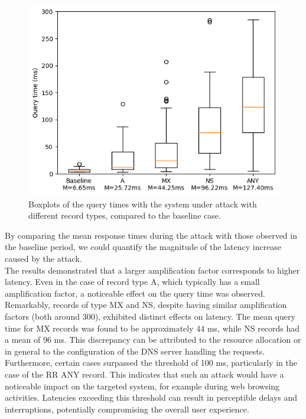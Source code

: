 \begin{figure}[H]
    \centering
    \includegraphics[width=\columnwidth]{Sections/Images/Boxplots_Query.png}
    \caption{Boxplots of the query times with the system under attack with different record types, compared to the baseline case.}
    \label{fig:Boxplots_Query1}
\end{figure}
\noindent By comparing the mean response times during the attack with those observed in the baseline period, we could quantify the magnitude of the latency increase caused by the attack.\\
The results demonstrated that a larger amplification factor corresponds to higher latency. Even in the case of record type A, which typically has a small amplification factor, a noticeable effect on the query time was observed. Remarkably, records of type MX and NS, despite having similar amplification factors (both around 300), exhibited distinct effects on latency. The mean query time for MX records was found to be approximately 44 ms, while NS records had a mean of 96 ms. This discrepancy can be attributed to the resource allocation or in general to the configuration of the DNS server handling the requests.\\
Furthermore, certain cases surpassed the threshold of 100 ms, particularly in the case of the RR ANY record. This indicates that such an attack would have a noticeable impact on the targeted system, for example during web browsing activities. Latencies exceeding this threshold can result in perceptible delays and interruptions, potentially compromising the overall user experience.\\
